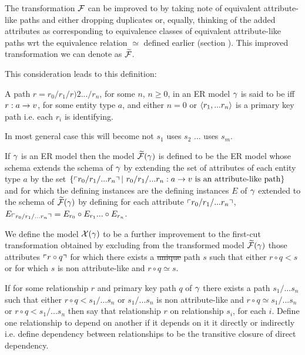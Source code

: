 The transformation $\mathcal{F}$ can be improved to by taking note of equivalent attribute-like paths and
either dropping duplicates or, equally, thinking of the added attributes as corresponding to equivalence classes of 
equivalent attribute-like paths wrt the equivalence relation $\simeq$ defined earlier (section ). This improved transformation we can denote as $\mathcal{\widetilde{F}}$.

This consideration leads  to this definition:
\begin{definition}
A path $r=r_0/r_1/r)2.../r_n$, for some $n$, $n \geq 0$, in an ER model $\gamma$ is 
said to be  iff $r: a \rightarrow v$, for some entity type $a$,
and either $n=0$ or $\langle r_1,...r_n\rangle$ is a primary key path i.e. each $r_i$ is identifying.
\end{definition}
\begin{noteforfuture}
In most general case this will become not $s_1$ uses $s_2$ ... uses $s_m$.
\end{noteforfuture}
If $\gamma$ is an ER model then the model $\mathcal{\widetilde{F}}(\gamma)$ is defined to be the ER model whose schema extends the schema of $\gamma$
by extending the set of attributes of each entity type $a$ by the set 
$\set{\qq{r_0/r_1/...r_n}  | \ r_0/r_1/...r_n: a \morph \veee \mbox{ is an attribute-like path}}$ and for which the defining instances are the defining  instances $E$ of $\gamma$ extended to the schema of $\mathcal{\widetilde{F}}(\gamma)$ by defining for each attribute $\left\ulcorner r_0/r_1/...r_n\right\urcorner$, $E_{\left\ulcorner r_0/r_1/...r_n\right\urcorner} = E_{r_0} \circ E_{r_1}... \circ E_{r_n}$.

We define the model $\mathcal{X}(\gamma)$ to be a further improvement to the first-cut transformation obtained by excluding  from  the transformed model $\mathcal{\widetilde{F}}(\gamma)$ those attributes $\left\ulcorner r \circ q\right\urcorner$ for which there exists a \sout{unique}  path $s$ such that  either  $r \circ q < s$ or for which $s$ is non attribute-like and $r \circ q \simeq s$. 

\begin{definition}
If for some relationship $r$ and primary key path $q$ of $\gamma$ there exists a  path $s_1/...s_n$ such that either   $r \circ q < s_1/...s_n$ or $s_1/...s_n$ is non attribute-like and $r \circ q \simeq s_1/...s_n$ or $r \circ q < s_1/...s_n$ then say that relationship $r$  on relationship $s_i$,
for each $i$. Define one relationship to depend on another if it depends on it it directly or indirectly i.e. define dependency between relationships to be the transitive closure of direct dependency.
\end{definition}

